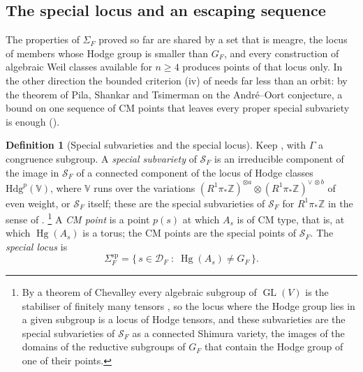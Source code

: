 \documentclass[11pt,reqno]{amsart}
\theoremstyle{plain}
\theoremstyle{definition}
\newtheorem{definition}[theorem]{Definition}
\theoremstyle{remark}
\newcommand{\ZZ}{\mathbb{Z}}
\newcommand{\cD}{\mathcal{D}}
\newcommand{\cS}{\mathcal{S}}
\newcommand{\Hdg}{\mathrm{Hdg}}
\DeclareMathOperator{\Hg}{Hg}
\DeclareMathOperator{\GL}{GL}
\begin{document}
\subsection{The special locus and an escaping sequence}
\label{ssec:speciallocus}

The properties of $\Sigma_{F}$ proved so far are shared by a set that is
meagre, the locus of members whose Hodge group is smaller than
$G_{F}$, and every construction of algebraic Weil classes available for
$n\ge4$ produces points of that locus only. In the other direction the
bounded criterion (iv) of  needs far less than an
orbit: by the theorem of Pila, Shankar and Tsimerman on the Andr\'e--Oort
conjecture, a bound on one sequence of CM points that leaves every proper
special subvariety is enough ().

\begin{definition}[Special subvarieties and the special locus]
\label{def:speciallocus}
Keep , with $\Gamma$ a congruence subgroup. A
\emph{special subvariety} of $\cS_{F}$ is an irreducible component of the
image in $\cS_{F}$ of a connected component of the locus of Hodge classes
$\Hdg^{p}(\mathbb{V})$, where $\mathbb{V}$ runs over the variations
$(R^{1}\pi_{*}\ZZ)^{\otimes a}\otimes(R^{1}\pi_{*}\ZZ)^{\vee\,\otimes b}$
of even weight, or $\cS_{F}$ itself; these are the special subvarieties of
$\cS_{F}$ for $R^{1}\pi_{*}\ZZ$ in the sense of \cite{KOU}.%
\footnote{By a theorem of Chevalley every algebraic subgroup of $\GL(V)$ is
the stabiliser of finitely many tensors \cite[\S3]{Del82}, so the locus where
the Hodge group lies in a given subgroup is a locus of Hodge tensors, and
these subvarieties are the special subvarieties of $\cS_{F}$ as a connected
Shimura variety, the images of the domains of the reductive subgroups of
$G_{F}$ that contain the Hodge group of one of their points.}
A \emph{CM point} is a point $p(s)$ at which $A_{s}$ is of CM type, that is,
at which $\Hg(A_{s})$ is a torus; the CM points are the special points of
$\cS_{F}$. The \emph{special locus} is
\[
  \Sigma^{\mathrm{sp}}_{F}
  =\{\,s\in\cD_{F}\;:\;\Hg(A_{s})\ne G_{F}\,\}.
\]
\end{definition}
\end{document}
